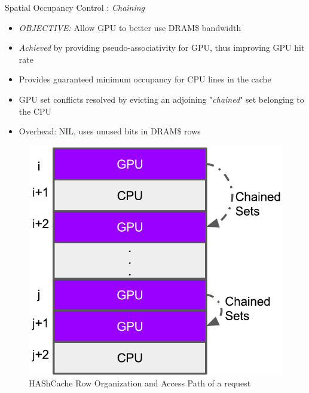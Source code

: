 \documentclass[final,t]{beamer}
\newcommand*\circled[1]{\tikz[baseline=(char.base)]{
            \node[shape=circle,draw,inner sep=2pt] (char) {#1};}}
\begin{document}
\begin{frame}[t,fragile]{}
\begin{columns}[t]
\begin{column}{.48\linewidth}
\begin{tcolorbox}
    \begin{exampleblock}{\circled{3} Spatial Occupancy Control : \textit{Chaining}}
    	\begin{itemize}
	    	\item \emph{OBJECTIVE:} Allow GPU to better use DRAM\$ bandwidth
		    \item \emph{Achieved} by providing pseudo-associativity for GPU, thus improving GPU hit rate
		    \item Provides guaranteed minimum occupancy for CPU lines in the cache
	    	\item GPU set conflicts resolved by evicting an adjoining "\textit{chained}" set belonging to the CPU
		    \item Overhead: NIL, uses unused bits in DRAM\$ rows
	    \end{itemize}
	\vspace{\baselineskip}
    \centering
    \begin{figure}
    	\centering
        \def\svgwidth{0.31\linewidth}
        \hspace{0.4em}	
    	\includegraphics[scale=1.1]{chainings}
    	\caption{HAShCache Row Organization and Access Path of a request}
    \end{figure}
    \end{exampleblock}
          

\end{tcolorbox}
\end{column}
\end{columns}
\end{frame}
\end{document}

